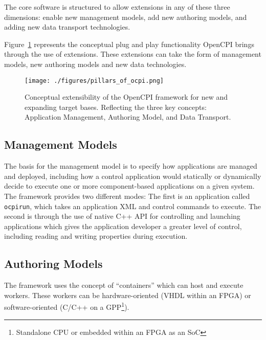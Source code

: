 The core software is structured to allow extensions in any of these three dimensions: enable new management models, add new authoring models, and adding new data transport technologies. \newline

Figure~\ref{fig:what_is_opencpi} represents the conceptual plug and play functionality OpenCPI brings through the use of extensions.
These extensions can take the form of management models, new authoring models and new data technologies.

\begin{figure}[h]
\centerline{\texttt{[image: ./figures/pillars\_of\_ocpi.png]}}
\caption{Conceptual extensibility of the OpenCPI framework for new and expanding target bases. Reflecting the three key concepts: Application Management, Authoring Model, and Data Transport.}
\label{fig:what_is_opencpi}
\end{figure}

\subsection{Management Models}
\label{subsec:Mangement_models}
The basis for the management model is to specify how applications are managed and deployed, including how a control application would statically or dynamically decide to execute one or more component-based applications on a given system.
The framework provides two different modes:
The first is an application called \verb+ocpirun+, which takes an application XML and control commands to execute.
The second is through the use of native C++ API for controlling and launching applications which gives the application developer a greater level of control, including reading and writing properties during execution.

\subsection{Authoring Models}
\label{subsec:Authoring_Models}
The framework uses the concept of ``containers'' which can host and execute workers. These workers can be hardware-oriented (VHDL within an FPGA) or software-oriented (C/C++ on a GPP\footnote{Standalone CPU or embedded within an FPGA as an SoC}).

